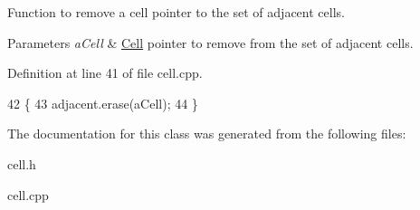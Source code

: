 Function to remove a cell pointer to the set of adjacent cells. 
\begin{DoxyParams}{Parameters}
{\em a\+Cell} & \hyperlink{class_cell}{Cell} pointer to remove from the set of adjacent cells. \\
\hline
\end{DoxyParams}


Definition at line 41 of file cell.\+cpp.


\begin{DoxyCode}
42 \{
43     adjacent.erase(aCell);
44 \}
\end{DoxyCode}


The documentation for this class was generated from the following files\+:\begin{DoxyCompactItemize}
\item 
cell.\+h\item 
cell.\+cpp\end{DoxyCompactItemize}
